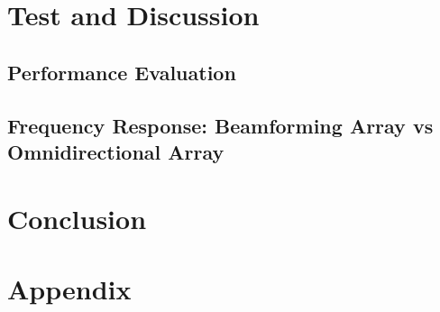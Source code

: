 \part{Test and Discussion}\label{pt:test}
\graphicspath{{figures/tests/}}
	\chapter{Performance Evaluation}
		

		
	\chapter{Frequency Response: Beamforming Array vs Omnidirectional Array}
		
		


 
\part{Conclusion}\label{pt:conclusion}
% 
%

\glsresetall
\appendix %

 \graphicspath{{figures/appendix/}}
\part{Appendix}\label{pt:appendix}















